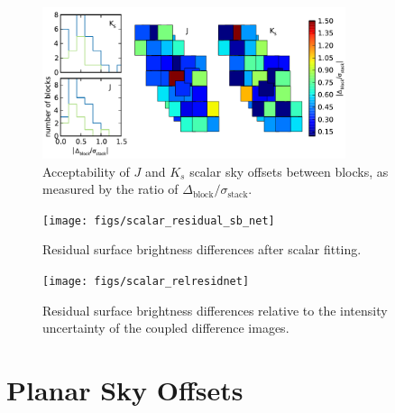 \documentclass[iop]{emulateapj}
\begin{document}
% 
% 
% 
% 
% 
% 

\begin{figure}[t]
    \centering
        \includegraphics[width=3.5in]{figs/offset_ratio_map_enhanced}
    \caption{Acceptability of $J$ and $K_s$ scalar sky offsets between blocks, as measured by the ratio of $\Delta_\mathrm{block}/\sigma_\mathrm{stack}$.}
    \label{fig:offset_ratio_map}
\end{figure}

\begin{figure}[t]
    \centering
        \texttt{[image: figs/scalar\_residual\_sb\_net]}
    \caption{Residual surface brightness differences after scalar fitting.}
    \label{fig:scalar_residual_sb_net}
\end{figure}

\begin{figure}[t]
    \centering
        \texttt{[image: figs/scalar\_relresidnet]}
    \caption{Residual surface brightness differences relative to the intensity uncertainty of the coupled difference images.}
    \label{fig:scalar_relresidnet}
\end{figure}

\section{Planar Sky Offsets}
\end{document}
